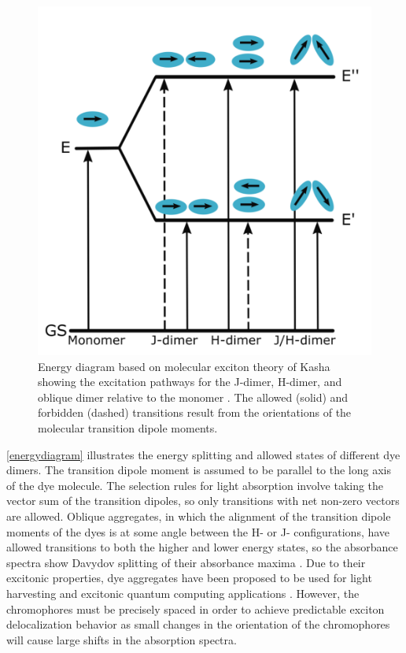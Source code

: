 \begin{figure}[h!]
    \centering
    \includegraphics[width=0.8\linewidth]{figures/pub1/energy-diagram.pdf}
    \caption{Energy diagram based on molecular exciton theory of Kasha showing the excitation pathways for the J-dimer, H-dimer, and oblique dimer relative to the monomer \cite{Wurthner2011}. The allowed (solid) and forbidden (dashed) transitions result from the orientations of the molecular transition dipole moments.}\label{energydiagram}
\end{figure}
\autoref{energydiagram} illustrates the energy splitting and allowed states of different dye dimers. The transition dipole moment is assumed to be parallel to the long axis of the dye molecule. The selection rules for light absorption involve taking the vector sum of the transition dipoles, so only transitions with net non-zero vectors are allowed. Oblique aggregates, in which the alignment of the transition dipole moments of the dyes is at some angle between the H- or J- configurations, have allowed transitions to both the higher and lower energy states, so the absorbance spectra show Davydov splitting of their absorbance maxima \cite{Davydov1964}. Due to their excitonic properties, dye aggregates have been proposed to be used for light harvesting and excitonic quantum computing applications \cite{Scholes2012a, Scholes2011b, Scholes2011a, Romero2017a}. However, the chromophores must be precisely spaced in order to achieve predictable exciton delocalization behavior as small changes in the orientation of the chromophores will cause large shifts in the absorption spectra.

